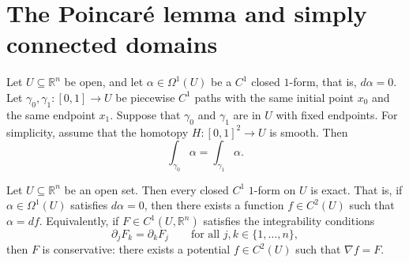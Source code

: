 
\section{The Poincaré lemma and simply connected domains}
\label{sec:poincare_lemma_simply_connected}

\begin{theorem}
\label{thm:poincare_lemma}
Let $U \subseteq \mathbb{R}^n$ be open, and let $\alpha \in \Omega^1(U)$ be a $C^1$ closed $1$-form, that is, $d\alpha = 0$.
Let $\gamma_0, \gamma_1 : [0,1] \to U$ be piecewise $C^1$ paths with the same initial point $x_0$ and the same endpoint $x_1$. Suppose that $\gamma_0$ and $\gamma_1$ are  in $U$ with fixed endpoints. For simplicity, assume that the homotopy $H : [0,1]^2 \to U$ is smooth. Then
\[\int_{\gamma_0} \alpha = \int_{\gamma_1} \alpha.\]
\end{theorem}

\begin{corollary}
\label{cor:potentials_simply_connected}
Let $U \subseteq \mathbb{R}^n$ be an open  set. Then every closed $C^1$ $1$-form on $U$ is exact. That is, if $\alpha \in \Omega^1(U)$ satisfies $d\alpha = 0$, then there exists a function $f \in C^2(U)$ such that $\alpha = df$.
Equivalently, if $F \in C^1(U, \mathbb{R}^n)$ satisfies the integrability conditions
\[\partial_j F_k = \partial_k F_j \qquad \text{for all } j, k \in \{1,\dots,n\},\]
then $F$ is conservative: there exists a potential $f \in C^2(U)$ such that $\nabla f = F$.
\end{corollary}

